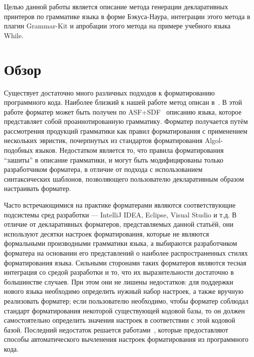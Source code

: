 \documentclass[conference]{IEEEtran}
\begin{document}
Целью данной работы является описание метода генерации декларативных принтеров по грамматике языка в форме Бэкуса-Наура, интеграции этого метода в плагин Grammar-Kit и апробации этого метода на примере учебного языка While.

\section{Обзор}
Существует достаточно много различных подходов к форматированию
программного кода.
Наиболее близкий к нашей работе метод описан в~\cite{Brand-Visser:ACM96}.
В этой работе форматер может быть получен по ASF+SDF~\cite{Klint:ACM93}
описанию языка, которое представляет собой проаннотированную грамматику.
Форматер получается путём 
рассмотрения продукций грамматики как правил форматирования
с применением нескольких эвристик,
почерпнутых из стандартов форматирования Algol-подобных языков.
Недостатком является то, что правила форматирования ``зашиты'' в
описание грамматики, и могут быть модифицированы только разработчиком
форматера,
в отличие от подхода с использованием синтаксических шаблонов,
позволяющего пользователю декларативным образом настраивать форматер.

Часто встречающимися на практике форматерами являются 
соответствующие подсистемы сред разработки --- IntelliJ IDEA, Eclipse,
Visual Studio и т.д. В отличие от декларативных форматеров, представляемых
данной статьёй, они используют десятки настроек форматирования,
которые не являются формальными производными грамматики языка,
а выбираются разработчиком форматера на основании его представлений
о наиболее распространенных стилях форматирования языка.
Сильными сторонами таких форматеров являются тесная интеграция
со средой разработки и то, что их выразительности достаточно в
большинстве случаев.
При этом они не лишены недостатков:
для поддержки нового языка
необходимо определить нужный набор настроек, а также вручную реализовать
форматер;
если пользователю необходимо, чтобы форматер соблюдал стандарт
форматирования некоторой существующей кодовой базы, то он должен
самостоятельно определить значения настроек
в соответствии с этой кодовой базой.
Последний недостаток решается
работами~\cite{Corbo-al:ICSM07,JB-Gen}, которые предоставляют
способы автоматического вычленения настроек форматирования из программного
кода.
\end{document}
